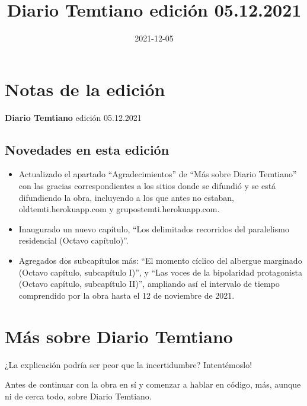 \documentclass[
  spanish,
]{book}
\title{Diario Temtiano edición 05.12.2021}
\author{}
\date{\vspace{-2.5em}2021-12-05}
\begin{document}
\maketitle

{
\setcounter{tocdepth}{1}
\tableofcontents
}
\hypertarget{notas-de-la-ediciuxf3n}{%
\chapter*{Notas de la edición}\label{notas-de-la-ediciuxf3n}}

\textbf{Diario Temtiano} edición 05.12.2021

\hypertarget{novedades-en-esta-ediciuxf3n}{%
\section*{Novedades en esta edición}\label{novedades-en-esta-ediciuxf3n}}

\begin{itemize}
\item
  Actualizado el apartado ``Agradecimientos'' de ``Más sobre Diario Temtiano'' con las gracias correspondientes a los sitios donde se difundió y se está difundiendo la obra, incluyendo a los que antes no estaban, oldtemti.herokuapp.com y grupostemti.herokuapp.com.
\item
  Inaugurado un nuevo capítulo, ``Los delimitados recorridos del paralelismo residencial (Octavo capítulo)''.
\item
  Agregados dos subcapítulos más: ``El momento cíclico del albergue marginado (Octavo capítulo, subcapítulo I)'', y ``Las voces de la bipolaridad protagonista (Octavo capítulo, subcapítulo II)'', ampliando así el intervalo de tiempo comprendido por la obra hasta el 12 de noviembre de 2021.
\end{itemize}

\hypertarget{muxe1s-sobre-diario-temtiano}{%
\chapter*{Más sobre Diario Temtiano}\label{muxe1s-sobre-diario-temtiano}}

¿La explicación podría ser peor que la incertidumbre? Intentémoslo!

Antes de continuar con la obra en sí y comenzar a hablar en código, más, aunque ni de cerca todo, sobre Diario Temtiano.
\end{document}
